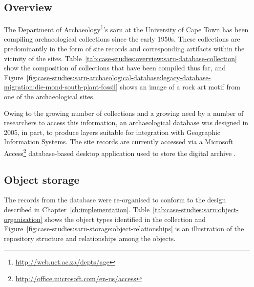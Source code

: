 \subsection[Overview]{Overview}
\label{sec:case-studies:saru-archaeological-database:legacy-database-migration}

The Department of Archaeology\footnote{\url{http://web.uct.ac.za/depts/age}}'s \gls{saru} at the University of Cape Town has been compiling archaeological collections since the early 1950s. These collections are predominantly in the form of site records and corresponding artifacts within the vicinity of the sites. Table~\ref{tab:case-studies:overview:saru-database-collection} show the composition of collections that have been compiled thus far, and Figure~\ref{fig:case-studies:saru-archaeological-database:legacy-database-migration:die-mond-south-plant-fossil} shows an image of a rock art motif from one of the archaeological sites.

Owing to the growing number of collections and a growing need by a number of researchers to access this information, an archaeological database was designed in 2005, in part, to produce layers suitable for integration with Geographic Information Systems. The site records are currently accessed via a Microsoft Access\footnote{\url{http://office.microsoft.com/en-us/access}} database-based desktop application used to store the digital archive \citep{Wiltshire2011}.

\tablespacing

\bodyspacing

\subsection{Object storage}
\label{sec:case-studies:saru-archaeological-database:implementation}


The records from the database were re-organised to conform to the design described in Chapter~\ref{ch:implementation}. Table~\ref{tab:case-studies:saru:object-organisation} shows the object types identified in the collection and Figure~\ref{fig:case-studies:saru-storage:object-relationships} is an illustration of the repository structure and relationships among the objects. 

